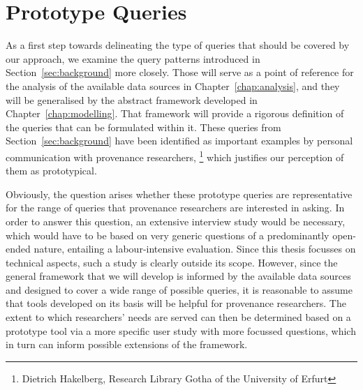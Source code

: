 \chapter{Prototype Queries}
\label{chap:prototype_queries}

As a first step towards delineating the type of queries that should be covered by our approach,
we examine the query patterns introduced in Section~\ref{sec:background} more closely.
Those will serve as a point of reference for the analysis of the available data sources
in Chapter~\ref{chap:analysis},
and they will be generalised by the abstract framework developed in Chapter~\ref{chap:modelling}.
That framework will provide a rigorous definition of the queries that can be formulated
within it.
These queries  from Section~\ref{sec:background} have been identified
as important examples by personal communication
with provenance researchers,%
\footnote{Dietrich Hakelberg, Research Library Gotha of the University of Erfurt}
which justifies our perception of them as prototypical.

Obviously, the question arises whether these prototype queries are representative
for the range of queries that provenance researchers are interested in asking.
In order to answer this question, an extensive interview study would be necessary,
which would have to be based on very generic questions of a predominantly open-ended nature,
entailing a labour-intensive evaluation.
Since this thesis focusses on technical aspects,
such a study is clearly outside its scope. However, since the general framework that we will develop
is informed by the available data sources
and designed to cover a wide range of possible queries,
it is reasonable to assume that tools developed on its basis will be helpful for provenance researchers.
The extent to which researchers' needs are served can then be determined based on a prototype tool via a more specific user study
with more focussed questions, which in turn can inform possible extensions of the framework.

